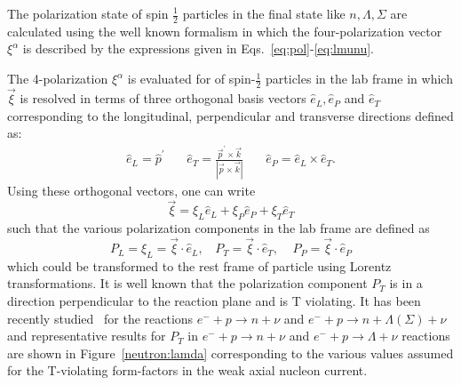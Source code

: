    The polarization state of spin $\frac{1}{2}$ particles in the final state like $n,\Lambda,\Sigma$ are calculated using the well known formalism in which the four-polarization vector $\xi^\alpha$ is described by the expressions given in Eqs.~\ref{eq:pol}-\ref{eq:lmunu}.
   
The 4-polarization $\xi^\alpha$ is evaluated for of spin-$\frac12$ particles in the lab frame in which $\vec{\xi}$ is resolved in  terms of three orthogonal basis vectors $\hat{e}_L,\hat{e}_P$ and $\hat{e}_T$ corresponding to the longitudinal, perpendicular and transverse directions defined as:
\begin{eqnarray}
\hat{e}_L= \hat{p}^\prime ~~~~~~~~ \hat{e}_T=\frac{\vec{p}^\prime\times \vec{k}}{|\vec{p}\times\vec{k}|}~~~~~~~~\hat{e}_P=\hat{e}_L\times\hat{e}_T.
\end{eqnarray}
Using these orthogonal vectors, one can write
\begin{equation}
\vec{\xi}=\xi_L\hat{e}_L+\xi_P\hat{e}_P+\xi_T\hat{e}_T
\end{equation}
such that the various polarization components in the lab frame are defined as 
\begin{equation}
P_{L}= \xi_L =\vec{\xi}\cdot \hat{e}_L,~~~~P_T=\vec{\xi}\cdot \hat{e}_T,~~~~~P_P=\vec{\xi}\cdot \hat{e}_P
\end{equation} 
which could be transformed to the rest frame of particle using Lorentz transformations. It is well known that the polarization component $P_T$ is in a direction perpendicular to the reaction plane and is T violating. It has been recently studied~\cite{Fatima:2018gjy} for the reactions $e^-+p\rightarrow n+\nu$ and $e^-+p\rightarrow n+\Lambda(\Sigma)+\nu$ and  representative results for $P_T$ in $e^-+p\rightarrow n+\nu$ and $e^-+p\rightarrow \Lambda+\nu$ reactions are shown in Figure~\ref{neutron:lamda} corresponding to the various values assumed for the T-violating form-factors in the weak axial nucleon current. 

